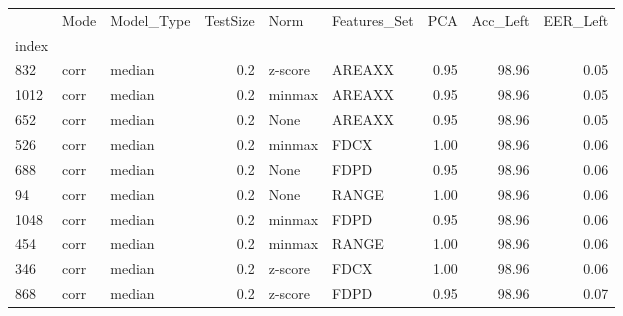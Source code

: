 \begin{tabular}{lllrllrrr}
\toprule
{} &  Mode & Model\_Type &  TestSize &     Norm & Features\_Set &   PCA &  Acc\_Left &  EER\_Left \\
index &       &            &           &          &              &       &           &           \\
\midrule
832   &  corr &     median &       0.2 &  z-score &       AREAXX &  0.95 &     98.96 &      0.05 \\
1012  &  corr &     median &       0.2 &   minmax &       AREAXX &  0.95 &     98.96 &      0.05 \\
652   &  corr &     median &       0.2 &     None &       AREAXX &  0.95 &     98.96 &      0.05 \\
526   &  corr &     median &       0.2 &   minmax &         FDCX &  1.00 &     98.96 &      0.06 \\
688   &  corr &     median &       0.2 &     None &         FDPD &  0.95 &     98.96 &      0.06 \\
94    &  corr &     median &       0.2 &     None &        RANGE &  1.00 &     98.96 &      0.06 \\
1048  &  corr &     median &       0.2 &   minmax &         FDPD &  0.95 &     98.96 &      0.06 \\
454   &  corr &     median &       0.2 &   minmax &        RANGE &  1.00 &     98.96 &      0.06 \\
346   &  corr &     median &       0.2 &  z-score &         FDCX &  1.00 &     98.96 &      0.06 \\
868   &  corr &     median &       0.2 &  z-score &         FDPD &  0.95 &     98.96 &      0.07 \\
\bottomrule
\end{tabular}
